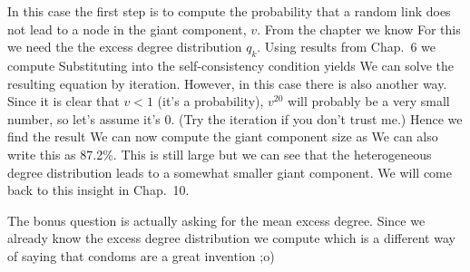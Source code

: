 \solution
In this case the first step is to compute the probability that a random link does not lead to a node in the giant component, $v$. From the chapter we know 
For this we need the the excess degree distribution $q_k$. 
Using results from Chap.~6 we compute
Substituting into the self-consistency condition yields
We can solve the resulting equation 
by iteration. However, in this case there is also another way. Since it is clear that $v<1$ (it's a probability), $v^{20}$ will probably be a very small number, so let's assume it's 0. (Try the iteration if you don't trust me.) Hence we find the result 
We can now compute the giant component size as 
We can also write this as 87.2\%. This is still large but we can see that the heterogeneous degree distribution leads to a somewhat smaller giant component. We will come back to this insight in Chap.~10.

The bonus question is actually asking for the mean excess degree. Since we already know the excess degree distribution we compute
which is a different way of saying that condoms are a great invention ;o) 